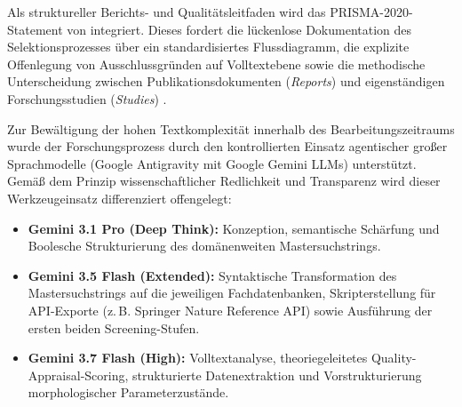 Als struktureller Berichts- und Qualitätsleitfaden wird das PRISMA-2020-Statement von \textcite[S.~1 bis 9]{BP42WGEK} integriert. Dieses fordert die lückenlose Dokumentation des Selektionsprozesses über ein standardisiertes Flussdiagramm, die explizite Offenlegung von Ausschlussgründen auf Volltextebene sowie die methodische Unterscheidung zwischen Publikationsdokumenten (\textit{Reports}) und eigenständigen Forschungsstudien (\textit{Studies}) \parencite[S.~3 bis 5]{BP42WGEK}.

Zur Bewältigung der hohen Textkomplexität innerhalb des Bearbeitungszeitraums wurde der Forschungsprozess durch den kontrollierten Einsatz agentischer großer Sprachmodelle (Google Antigravity mit Google Gemini LLMs) unterstützt. Gemäß dem Prinzip wissenschaftlicher Redlichkeit und Transparenz wird dieser Werkzeugeinsatz differenziert offengelegt:
\begin{itemize}[leftmargin=*]
  \item \textbf{Gemini 3.1 Pro (Deep Think):} Konzeption, semantische Schärfung und Boolesche Strukturierung des domänenweiten Mastersuchstrings.
  \item \textbf{Gemini 3.5 Flash (Extended):} Syntaktische Transformation des Mastersuchstrings auf die jeweiligen Fachdatenbanken, Skripterstellung für API-Exporte (z.\,B. Springer Nature Reference API) sowie Ausführung der ersten beiden Screening-Stufen.
  \item \textbf{Gemini 3.7 Flash (High):} Volltextanalyse, theoriegeleitetes Quality-Appraisal-Scoring, strukturierte Datenextraktion und Vorstrukturierung morphologischer Parameterzustände.
\end{itemize}

